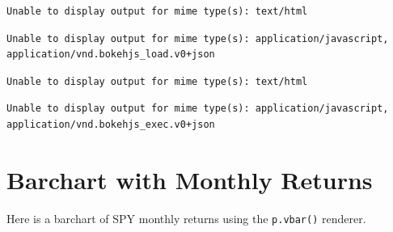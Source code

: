 \documentclass[
  letterpaper,
  DIV=11,
  numbers=noendperiod]{scrreprt}
\begin{document}
\begin{verbatim}
Unable to display output for mime type(s): text/html
\end{verbatim}

\begin{verbatim}
Unable to display output for mime type(s): application/javascript, application/vnd.bokehjs_load.v0+json
\end{verbatim}

\begin{verbatim}
Unable to display output for mime type(s): text/html
\end{verbatim}

\begin{verbatim}
Unable to display output for mime type(s): application/javascript, application/vnd.bokehjs_exec.v0+json
\end{verbatim}

\hypertarget{barchart-with-monthly-returns}{%
\section{Barchart with Monthly
Returns}\label{barchart-with-monthly-returns}}

Here is a barchart of SPY monthly returns using the \texttt{p.vbar()}
renderer.
\end{document}
